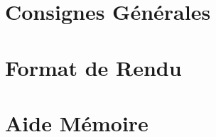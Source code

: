 \documentclass[12pt,a4paper]{article}
\begin{document}
\maketitle





\newpage

\tableofcontents

\newpage

\section{Consignes Générales}

\bigskip



\newpage

\section{Format de Rendu}
\label{sec:FormatDeRendu}

\vspace*{1cm}



\newpage

\section{Aide Mémoire}
\label{sec:AideMemoire}

\vspace*{1cm}



\newpage




%


\end{document}

